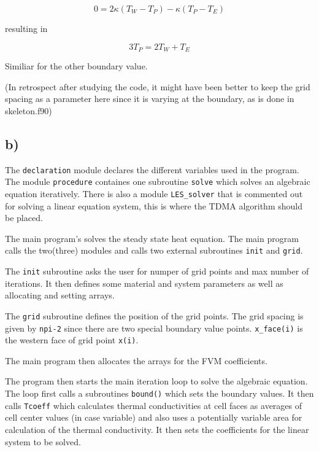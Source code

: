 \documentclass{article}
\begin{document}
\begin{equation}
0 = 2\kappa ( T_W - T_P ) - \kappa ( T_P - T_E )
\end{equation}

resulting in

\begin{equation}
3 T_P =  2 T_W + T_E 
\end{equation}

Similiar for the other boundary value.

(In retrospect after studying the code, it might have been better to keep the grid spacing as a  parameter here since it is varying at the boundary, as is done in skeleton.f90)

\subsection{b)}
The \texttt{declaration} module declares the different variables used in the program. The module \texttt{procedure} containes one subroutine \texttt{solve} which solves an algebraic equation iteratively. There is also a module \texttt{LES\_solver} that is commented out for solving a linear equation system, this is where the TDMA algorithm should be placed.

The main program's solves the steady state heat equation. The main program calls the two(three) modules and calls two external subroutines \texttt{init} and \texttt{grid}.

The \texttt{init} subroutine asks the user for numper of grid points and max number of iterations. It then defines some material and system parameters as well as allocating and setting arrays.

The \texttt{grid} subroutine defines the position of the grid points. The grid spacing is given by \texttt{npi-2} since there are two special boundary value points. \texttt{x\_face(i)} is the western face of grid point \texttt{x(i)}.

The main program then allocates the arrays for the FVM coefficients.

The program then starts the main iteration loop to solve the algebraic equation. The loop first calls a subroutines \texttt{bound()} which sets the boundary values. It then calls \texttt{Tcoeff} which calculates thermal conductivities at cell faces as averages of cell center values (in case variable) and also uses a potentially variable area for calculation of the thermal conductivity. It then sets the coefficients for the linear system to be solved.
\end{document}
